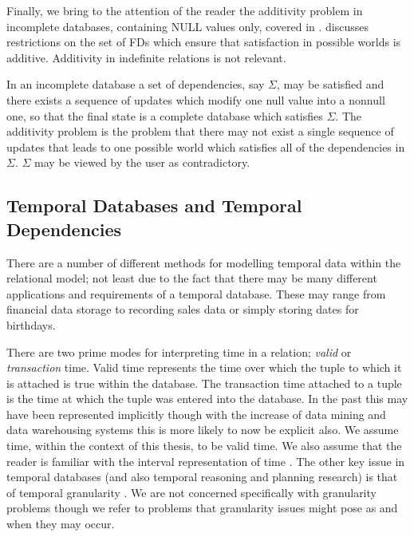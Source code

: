 Finally, we bring to the attention of the reader the additivity
problem in incomplete databases, containing NULL values only, covered
in \cite{ll98b}. \cite{ll98b} discusses restrictions on the set of FDs
which ensure that satisfaction in possible worlds is
additive. Additivity in indefinite relations is not relevant.

\begin{definition}
\begin{rm}
In an incomplete database a set of dependencies, say $\Sigma$, may be satisfied
and there exists a sequence of updates which modify one null value into a 
nonnull one, so that the final state is a complete database which satisfies
$\Sigma$.  The additivity problem is the problem that there may not exist
a single sequence of updates that leads to one possible world which satisfies
all of the dependencies in $\Sigma$.  $\Sigma$ may be viewed by the user
as contradictory.
\end{rm}
\end{definition}




\subsection{Temporal Databases and Temporal Dependencies}\label{subsec:temdat}

There are a number of different methods for modelling temporal data
within the relational model; not least due to the fact that there may be
many different applications and requirements of a temporal
database. These may range from financial data storage to recording
sales data or simply storing dates for birthdays. 

\medskip

There are two prime modes for interpreting time in a relation; {\em
valid} or {\em transaction} time. Valid time represents the time over
which the tuple to which it is attached is true within the
database. The transaction time attached to a tuple is the time at
which  the tuple was entered into the database. In the past this may
have been represented implicitly though with the increase of data
mining and data warehousing systems this is more likely to now be
explicit also. We assume
time, within the context of this thesis, to be valid time. We also
assume that the reader is familiar with the interval representation of
time \cite{all84}. The other key issue in temporal databases (and also
temporal reasoning and planning research) is that of temporal
granularity \cite{bwj96}. We are not concerned specifically with
granularity problems though we refer to problems that granularity
issues might pose as and when they may occur.

